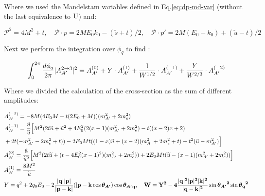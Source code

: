 Where we used the Mandelstam variables defined in Eq.\ref{eq:dp-md-var} (without the last equivalence to $\rm{U}$) and:

\begin{equation}
  \label{eq:dp-md-var-2}
  \mathcal{P}^2 = 4M^2 + t, \quad \mathcal{P} \cdot p = 2 M E_0 k_0 - (\widetilde{s} + t)/2, \quad \mathcal{P} \cdot p' = 2 M (E_0 - k_0) + (\widetilde{u} - t)/2
\end{equation}

Next we perform the integration over $\phi_q$ to find \cite{DMsimulation}:

\begin{equation}
  \label{eq:dp-cs-tl-int}
  \int_0^{2\pi} \frac{d\phi_q}{2\pi} |A^{2 \to 3}_{A'}|^2 = A^{(0)}_{A'} + Y \cdot A^{(1)}_{A'} + \frac{1}{W^{1/2}} \cdot A^{(-1)}_{A'} + \frac{Y}{W^{2/3}} \cdot A^{(-2)}_{A'}
\end{equation}

Where we divided the calculation of the cross-section as the sum of different amplitudes:

\begin{equation}
  \label{eq:dp-cs-tl-par}
  \begin{aligned}
    &A^{(-2)}_{A'} = -8M (4E_0M - t(2E_0 + M ))(m^2_{A'} + 2m^2_e)\\
    &A^{(-1)}_{A'} = \frac{8}{\widetilde{u}} \Big[ M^2 (2t\widetilde{u} + \widetilde{u}^2 + 4E_0^2 (2(x-1)(m^2_{A'} + 2m_e^2) - t((x-2)x + 2)\\
    &+ 2t(-m^2_{A'} - 2m_e^2 + t)) - 2E_0 M t ((1-x)\widetilde{u} + (x-2)(m^2_{A'} + 2m^2_e + t) + t^2 (\widetilde{u} - m^2_{A'}) \Big] \\
    &A^{(0)}_{A'} = \frac{8}{\widetilde{u}^2} \Big[ M^2 (2t\widetilde{u} + (t - 4E_0^2(x-1)^2)(m^2_{A'} + 2m^2_e)) + 2E_0M t (\widetilde{u} - (x-1)(m^2_{A'} + 2m^2_e)) \Big] \\
    &A^{(1)}_{A'} = \frac{8M^2}{\widetilde{u}} \\
    &Y = q^2 + 2q_0 E_0 - 2 \frac{|\bf{q}| |\bf{p}|}{|\bf{p} - \bf{k}|} (|\bf{p} - \bf{k} \cos{\boldsymbol{\theta_{A'}}})\cos{\boldsymbol{\theta_{A'}}_q}, \quad W = Y^2 - 4 \frac{|\bf{q}|^2|\bf{p}|^2|\bf{k}|^2}{|\bf{q} - \bf{k}|^2} \sin{\boldsymbol{\theta_{A'}}}^2\sin{\boldsymbol{\theta}_q}^2
  \end{aligned}
\end{equation}

